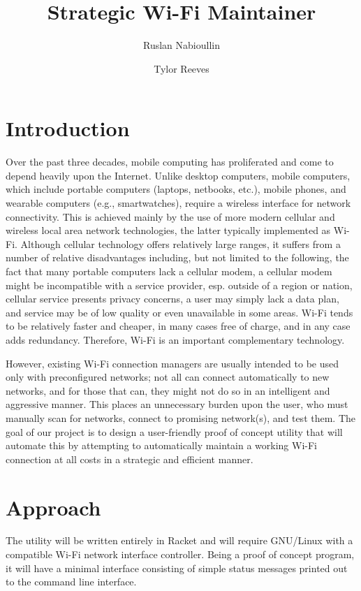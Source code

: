 \documentclass{article}
\title{Strategic Wi-Fi Maintainer}
\author{
  Ruslan Nabioullin
  \and
  Tylor Reeves\\
}
\begin{document}
\maketitle

\section{Introduction}
Over the past three decades, mobile computing has proliferated and come to
depend heavily upon the Internet. Unlike desktop computers, mobile computers,
which include portable computers (laptops, netbooks, etc.), mobile phones, and
wearable computers (e.g., smartwatches), require a wireless interface for
network connectivity. This is achieved mainly by the use of more modern cellular
and wireless local area network technologies, the latter typically implemented
as Wi-Fi. Although cellular technology offers relatively large ranges, it
suffers from a number of relative disadvantages including, but not limited to
the following, the fact that many portable computers lack a cellular modem, a
cellular modem might be incompatible with a service provider, esp. outside of a
region or nation, cellular service presents privacy concerns, a user may simply
lack a data plan, and service may be of low quality or even unavailable in some
areas. Wi-Fi tends to be relatively faster and cheaper, in many cases free of
charge, and in any case adds redundancy. Therefore, Wi-Fi is an important
complementary technology.

However, existing Wi-Fi connection managers are usually intended to be used only
with preconfigured networks; not all can connect automatically to new networks,
and for those that can, they might not do so in an intelligent and aggressive
manner. This places an unnecessary burden upon the user, who must manually scan
for networks, connect to promising network(s), and test them. The goal of our
project is to design a user-friendly proof of concept utility that will automate
this by attempting to automatically maintain a working Wi-Fi connection at all
costs in a strategic and efficient manner.

\section{Approach}
The utility will be written entirely in Racket and will require GNU/Linux with a
compatible Wi-Fi network interface controller. Being a proof of concept program,
it will have a minimal interface consisting of simple status messages printed
out to the command line interface.
\end{document}
